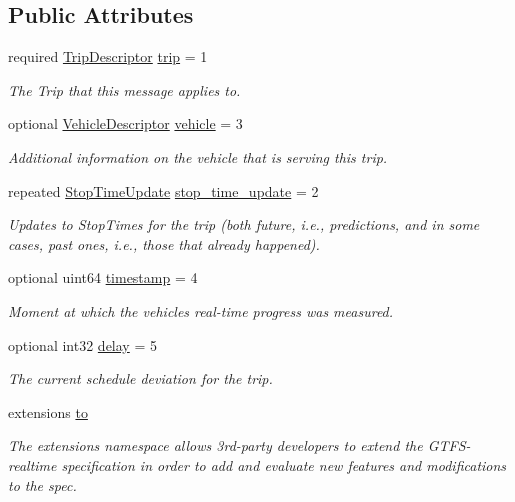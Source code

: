 \subsection*{Public Attributes}
\begin{DoxyCompactItemize}
\item 
required \hyperlink{structTripDescriptor}{Trip\+Descriptor} \hyperlink{structTripUpdate_a4589512fcd9e14cae56c57a77f4b76fb}{trip} = 1
\begin{DoxyCompactList}\small\item\em The Trip that this message applies to. \end{DoxyCompactList}\item 
optional \hyperlink{structVehicleDescriptor}{Vehicle\+Descriptor} \hyperlink{structTripUpdate_a90b612e02be20f87c44e310a93b87d6e}{vehicle} = 3\hypertarget{structTripUpdate_a90b612e02be20f87c44e310a93b87d6e}{}\label{structTripUpdate_a90b612e02be20f87c44e310a93b87d6e}

\begin{DoxyCompactList}\small\item\em Additional information on the vehicle that is serving this trip. \end{DoxyCompactList}\item 
repeated \hyperlink{structTripUpdate_1_1StopTimeUpdate}{Stop\+Time\+Update} \hyperlink{structTripUpdate_a2bfd408c9bcb02945e07162f91cf012f}{stop\+\_\+time\+\_\+update} = 2
\begin{DoxyCompactList}\small\item\em Updates to Stop\+Times for the trip (both future, i.\+e., predictions, and in some cases, past ones, i.\+e., those that already happened). \end{DoxyCompactList}\item 
optional uint64 \hyperlink{structTripUpdate_a9c5a10025b4a68a78c3c0f0579186ea4}{timestamp} = 4
\begin{DoxyCompactList}\small\item\em Moment at which the vehicle\textquotesingle{}s real-\/time progress was measured. \end{DoxyCompactList}\item 
optional int32 \hyperlink{structTripUpdate_ad989dc481a35f7cdbf0bd640a33b67b6}{delay} = 5
\begin{DoxyCompactList}\small\item\em The current schedule deviation for the trip. \end{DoxyCompactList}\item 
extensions \hyperlink{structTripUpdate_a08a29e188c045d0e7c8030e093883f85}{to}
\begin{DoxyCompactList}\small\item\em The extensions namespace allows 3rd-\/party developers to extend the G\+T\+F\+S-\/realtime specification in order to add and evaluate new features and modifications to the spec. \end{DoxyCompactList}\end{DoxyCompactItemize}


